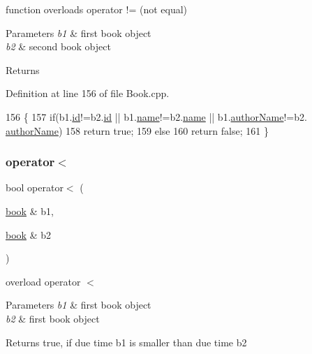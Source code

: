 function overloads operator != (not equal) 
\begin{DoxyParams}{Parameters}
{\em b1} & first book object \\
\hline
{\em b2} & second book object \\
\hline
\end{DoxyParams}
\begin{DoxyReturn}{Returns}

\end{DoxyReturn}


Definition at line 156 of file Book.\+cpp.


\begin{DoxyCode}
156                                                  \{
157     \textcolor{keywordflow}{if}(b1.\hyperlink{classbook_ad8bf54b50c72af3827823c04d724d824}{id}!=b2.\hyperlink{classbook_ad8bf54b50c72af3827823c04d724d824}{id} || b1.\hyperlink{classbook_a5eabc1c1c5abff26997bec3d41f90d9e}{name}!=b2.\hyperlink{classbook_a5eabc1c1c5abff26997bec3d41f90d9e}{name} || b1.\hyperlink{classbook_a21b2962c6227818732db27f12121b732}{authorName}!=b2.
      \hyperlink{classbook_a21b2962c6227818732db27f12121b732}{authorName})
158         \textcolor{keywordflow}{return} \textcolor{keyword}{true};
159     \textcolor{keywordflow}{else}
160         \textcolor{keywordflow}{return} \textcolor{keyword}{false};
161 \}
\end{DoxyCode}
\mbox{\label{classbook_a3d386e1f8255c6b62d9858fb8ff41c86}} 
\subsubsection{\texorpdfstring{operator$<$}{operator<}}
{\footnotesize\ttfamily bool operator$<$ (\begin{DoxyParamCaption}\item[{\hyperlink{classbook}{book} \&}]{b1,  }\item[{\hyperlink{classbook}{book} \&}]{b2 }\end{DoxyParamCaption})\hspace{0.3cm}{\ttfamily [friend]}}

overload operator $<$ 
\begin{DoxyParams}{Parameters}
{\em b1} & first book object \\
\hline
{\em b2} & first book object \\
\hline
\end{DoxyParams}
\begin{DoxyReturn}{Returns}
true, if due time b1 is smaller than due time b2 
\end{DoxyReturn}


